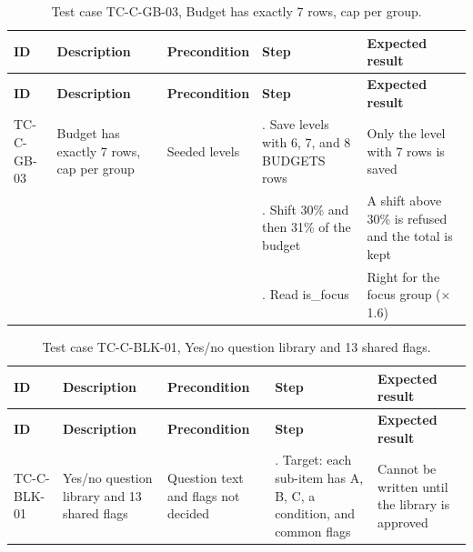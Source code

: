{\small
\begin{longtable}{|>{\raggedright\arraybackslash}p{}|>{\raggedright\arraybackslash}p{}|>{\raggedright\arraybackslash}p{}|>{\raggedright\arraybackslash}p{}|>{\raggedright\arraybackslash}p{}|}
\caption{Test case TC-C-GB-03, Budget has exactly 7 rows, cap per group.} \\
\hline
\textbf{ID} & \textbf{Description} & \textbf{Precondition} & \textbf{Step} & \textbf{Expected result} \\ \hline
\endfirsthead
\hline
\textbf{ID} & \textbf{Description} & \textbf{Precondition} & \textbf{Step} & \textbf{Expected result} \\ \hline
\endhead
TC-C-GB-03 & Budget has exactly 7 rows, cap per group & Seeded levels & 1. Save levels with 6, 7, and 8 BUDGETS rows & Only the level with 7 rows is saved \\ \hline
 &  &  & 2. Shift 30\% and then 31\% of the budget & A shift above 30\% is refused and the total is kept \\ \hline
 &  &  & 3. Read is\_focus & Right for the focus group (× 1.6) \\ \hline
\end{longtable}
}

{\small
\begin{longtable}{|>{\raggedright\arraybackslash}p{}|>{\raggedright\arraybackslash}p{}|>{\raggedright\arraybackslash}p{}|>{\raggedright\arraybackslash}p{}|>{\raggedright\arraybackslash}p{}|}
\caption{Test case TC-C-BLK-01, Yes/no question library and 13 shared flags.} \\
\hline
\textbf{ID} & \textbf{Description} & \textbf{Precondition} & \textbf{Step} & \textbf{Expected result} \\ \hline
\endfirsthead
\hline
\textbf{ID} & \textbf{Description} & \textbf{Precondition} & \textbf{Step} & \textbf{Expected result} \\ \hline
\endhead
TC-C-BLK-01 & Yes/no question library and 13 shared flags & Question text and flags not decided & 1. Target: each sub-item has A, B, C, a condition, and common flags & Cannot be written until the library is approved \\ \hline
\end{longtable}
}

